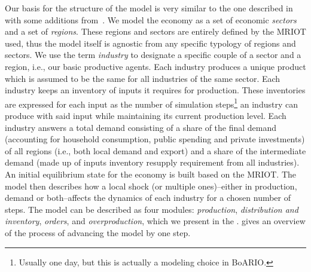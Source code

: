 \documentclass[main.tex]{subfiles}
\begin{document}
Our basis for the structure of the model is very similar to the one described
in~\textcite{hallegatte-2013-model-role} with some additions
from~\textcite{guan-2020-global-suppl}. We model the economy as a set of economic \emph{sectors}
and a set of \emph{regions}. These regions and sectors are entirely defined by
the \acrfull{MRIOT} used, thus the model itself is agnostic from any specific
typology of regions and sectors. We use the term \emph{industry} to designate a
specific couple of a sector and a region, i.e., our basic productive agents.
Each industry produces a unique product which is assumed to be the same for all
industries of the same sector. Each industry keeps an inventory of inputs it
requires for production. These inventories are expressed for each
input as the number of simulation steps\footnote{Usually one day, but this is
  actually a modeling choice in BoARIO.} an industry can produce with said input
while maintaining its current production level. Each industry answers a total demand consisting of a
share of the final demand (accounting for household consumption, public spending
and private investments) of all regions (i.e., both local demand and export) and
a share of the intermediate demand (made up of inputs inventory resupply
requirement from all industries). An initial equilibrium state for the economy is built based on
the MRIOT. The model then describes how a local
shock (or multiple ones)--either in production, demand or both--affects the
dynamics of each industry for a chosen number of steps. The model can be
described as four modules: \emph{production}, \emph{distribution and inventory},
\emph{orders}, and \emph{overproduction}, which we present in the
.  gives an overview
of the process of advancing the model by one step.
\end{document}
